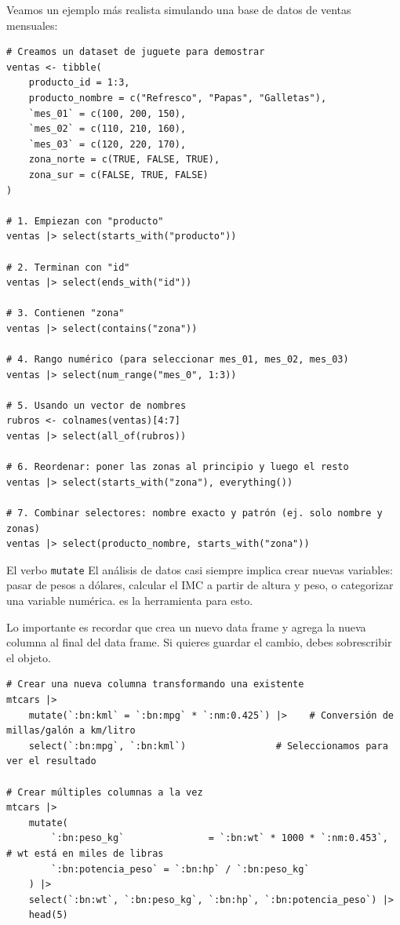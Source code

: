 \documentclass[8pt]{beamer}
\begin{document}
\begin{frame}[fragile]{}
Veamos un ejemplo más realista simulando una base de datos de ventas mensuales:
\begin{lstlisting}[style=RScript]
# Creamos un dataset de juguete para demostrar
ventas <- tibble(
	producto_id = 1:3,
	producto_nombre = c("Refresco", "Papas", "Galletas"),
	`mes_01` = c(100, 200, 150),
	`mes_02` = c(110, 210, 160),
	`mes_03` = c(120, 220, 170),
	zona_norte = c(TRUE, FALSE, TRUE),
	zona_sur = c(FALSE, TRUE, FALSE)
)

# 1. Empiezan con "producto"
ventas |> select(starts_with("producto"))

# 2. Terminan con "id"
ventas |> select(ends_with("id"))

# 3. Contienen "zona"
ventas |> select(contains("zona"))

# 4. Rango numérico (para seleccionar mes_01, mes_02, mes_03)
ventas |> select(num_range("mes_0", 1:3))

# 5. Usando un vector de nombres
rubros <- colnames(ventas)[4:7]
ventas |> select(all_of(rubros))

# 6. Reordenar: poner las zonas al principio y luego el resto
ventas |> select(starts_with("zona"), everything())

# 7. Combinar selectores: nombre exacto y patrón (ej. solo nombre y zonas)
ventas |> select(producto_nombre, starts_with("zona"))
\end{lstlisting}
\end{frame}







\begin{frame}[fragile]{El verbo \texttt{mutate}}
	El análisis de datos casi siempre implica crear nuevas variables: pasar de pesos a dólares, calcular el IMC a partir de altura y peso, o categorizar una variable numérica.  es la herramienta para esto.
	
	Lo importante es recordar que  crea un nuevo data frame y agrega la nueva columna al final del data frame. Si quieres guardar el cambio, debes sobrescribir el objeto.
\begin{lstlisting}[style=RScript]
# Crear una nueva columna transformando una existente
mtcars |> 
	mutate(`:bn:kml` = `:bn:mpg` * `:nm:0.425`) |>    # Conversión de millas/galón a km/litro
	select(`:bn:mpg`, `:bn:kml`)                # Seleccionamos para ver el resultado
	
# Crear múltiples columnas a la vez
mtcars |> 
	mutate(
		`:bn:peso_kg`				= `:bn:wt` * 1000 * `:nm:0.453`,  # wt está en miles de libras
		`:bn:potencia_peso` = `:bn:hp` / `:bn:peso_kg`
	) |> 
	select(`:bn:wt`, `:bn:peso_kg`, `:bn:hp`, `:bn:potencia_peso`) |> 
	head(5)
\end{lstlisting}	
\end{frame}
\end{document}
